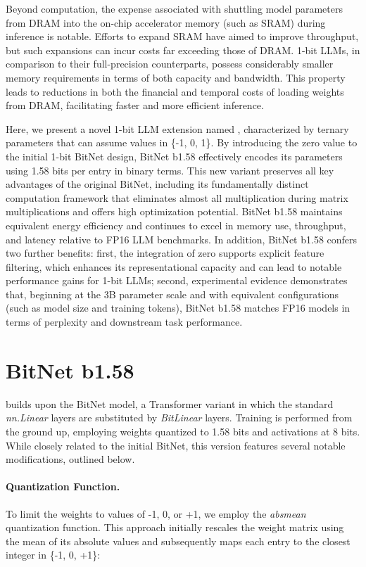 Beyond computation, the expense associated with shuttling model parameters from DRAM into the on-chip accelerator memory (such as SRAM) during inference is notable. Efforts to expand SRAM have aimed to improve throughput, but such expansions can incur costs far exceeding those of DRAM. 1-bit LLMs, in comparison to their full-precision counterparts, possess considerably smaller memory requirements in terms of both capacity and bandwidth. This property leads to reductions in both the financial and temporal costs of loading weights from DRAM, facilitating faster and more efficient inference.

Here, we present a novel 1-bit LLM extension named \textbf{}, characterized by ternary parameters that can assume values in \{-1, 0, 1\}. By introducing the zero value to the initial 1-bit BitNet design, BitNet b1.58 effectively encodes its parameters using 1.58 bits per entry in binary terms. This new variant preserves all key advantages of the original BitNet, including its fundamentally distinct computation framework that eliminates almost all multiplication during matrix multiplications and offers high optimization potential. BitNet b1.58 maintains equivalent energy efficiency and continues to excel in memory use, throughput, and latency relative to FP16 LLM benchmarks. In addition, BitNet b1.58 confers two further benefits: first, the integration of zero supports explicit feature filtering, which enhances its representational capacity and can lead to notable performance gains for 1-bit LLMs; second, experimental evidence demonstrates that, beginning at the 3B parameter scale and with equivalent configurations (such as model size and training tokens), BitNet b1.58 matches FP16 models in terms of perplexity and downstream task performance.

\section{BitNet b1.58}

 builds upon the BitNet model, a Transformer variant in which the standard \emph{nn.Linear} layers are substituted by \emph{BitLinear} layers. Training is performed from the ground up, employing weights quantized to 1.58 bits and activations at 8 bits. While closely related to the initial BitNet, this version features several notable modifications, outlined below.

\paragraph{Quantization Function.} To limit the weights to values of -1, 0, or +1, we employ the \emph{absmean} quantization function. This approach initially rescales the weight matrix using the mean of its absolute values and subsequently maps each entry to the closest integer in \{-1, 0, +1\}:

